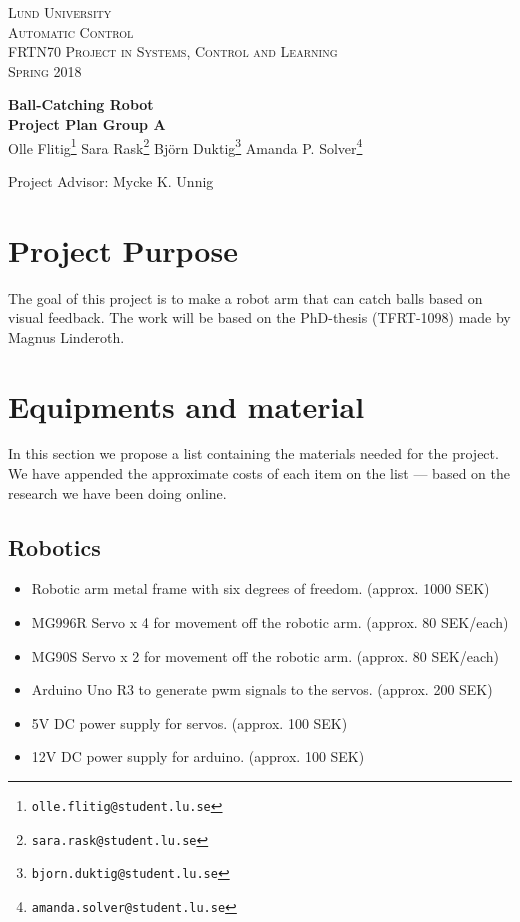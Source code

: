 \documentclass{article}
\begin{document}
\begin{titlepage}
  \begin{flushleft}\scshape
    Lund University\\
    Automatic Control\\[\smallskipamount]
    FRTN70 Project in Systems, Control and Learning\\
    Spring 2018
  \end{flushleft}
  \vspace*{0pt plus 0.3fill}
  \begin{center}
    \huge \textbf{Ball-Catching Robot}\\[4mm]     
    \large\textbf{Project Plan Group A}\\[5mm]
         Olle Flitig\footnote{\texttt{olle.flitig@student.lu.se}}\quad
         Sara Rask\footnote{\texttt{sara.rask@student.lu.se}}\quad
         Björn Duktig\footnote{\texttt{bjorn.duktig@student.lu.se}}\quad
         Amanda P. Solver\footnote{\texttt{amanda.solver@student.lu.se}}
  \end{center}
\begin{center}
    Project Advisor: Mycke K. Unnig
\end{center}
\vfill
\end{titlepage}        

\section{Project Purpose}
The goal of this project is to make a robot arm that can catch balls based on visual feedback. The work will be based on the PhD-thesis (TFRT-1098) made by Magnus Linderoth.

\section{Equipments and material} \label{sec:equipment}
In this section we propose a list containing the materials needed for the project. We have appended the approximate costs of each item on the list --- based on the research we have been doing online.
\subsection{Robotics}
    \begin{itemize}
        \item Robotic arm metal frame with six degrees of freedom. (approx. 1000 SEK)
        \item MG996R Servo x 4 for movement off the robotic arm. (approx. 80 SEK/each)
        \item MG90S Servo x 2 for movement off the robotic arm. (approx. 80 SEK/each)
        \item Arduino Uno R3 to generate pwm signals to the servos. (approx. 200 SEK)
        \item 5V DC power supply for servos. (approx. 100 SEK)
        \item 12V DC power supply for arduino. (approx. 100 SEK)
    \end{itemize}
\end{document}
